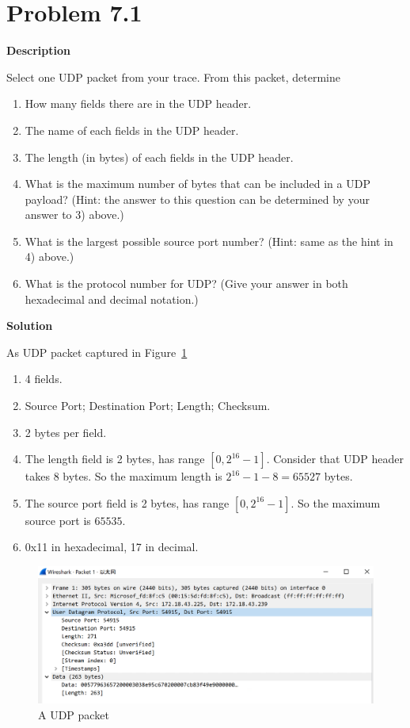 \documentclass[12pt,letterpaper]{ctexart}
\begin{document}
\section*{Problem 7.1}

{\bf Description}

Select one UDP packet from your trace. From this packet, determine
\begin{enumerate}
  \item How many fields there are in the UDP header.
  \item The name of each fields in the UDP header.
  \item The length (in bytes) of each fields in the UDP header.
  \item What is the maximum number of bytes that can be included in a UDP payload?  (Hint: the answer to this question can be determined by your answer to 3) above.)
  \item What is the largest possible source port number? (Hint: same as the hint in 4) above.)
  \item What is the protocol number for UDP? (Give your answer in both hexadecimal and decimal notation.)
\end{enumerate}


{\bf Solution}

As UDP packet captured in Figure~\ref{fig:udp}

\begin{enumerate}
  \item 4 fields.
  \item Source Port; Destination Port; Length; Checksum.
  \item 2 bytes per field.
  \item The length field is 2 bytes, has range $[0, 2^{16}-1]$. Consider that UDP header takes 8 bytes. So the maximum length is $2^{16}-1-8 = 65527$ bytes.
  \item The source port field is 2 bytes, has range $[0, 2^{16}-1]$. So the maximum source port is $65535$.
  \item 0x11 in hexadecimal, 17 in decimal.
\end{enumerate}


\begin{figure}[H]
  \centering
  \includegraphics[width=\linewidth]{assets/udp.png}
  \caption{A UDP packet}
  \label{fig:udp}
\end{figure}
\end{document}
